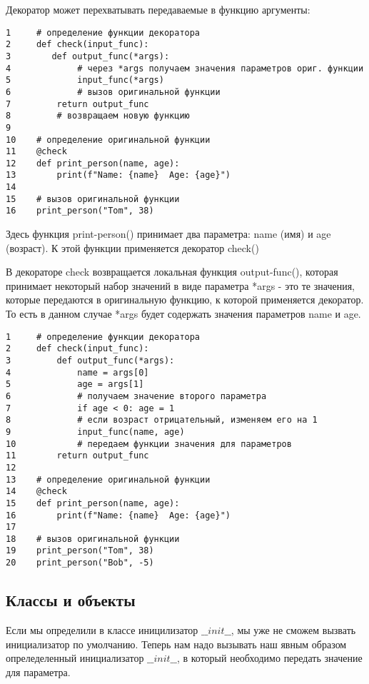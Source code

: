 \documentclass[12pt, a4paper]{article}
\begin{document}
Декоратор может перехватывать передаваемые в функцию аргументы:

\begin{verbatim}
1     # определение функции декоратора
2     def check(input_func):    
3        def output_func(*args):      
4             # через *args получаем значения параметров ориг. функции
5             input_func(*args)                
6             # вызов оригинальной функции
7         return output_func     
8         # возвращаем новую функцию
9  
10    # определение оригинальной функции
11    @check
12    def print_person(name, age):
13        print(f"Name: {name}  Age: {age}")
14 
15    # вызов оригинальной функции
16    print_person("Tom", 38)
\end{verbatim}

Здесь функция print-person() принимает два параметра: name (имя) и age (возраст). К этой функции применяется декоратор check()

\vspace{1em}

В декораторе check возвращается локальная функция output-func(), которая принимает некоторый набор значений в виде параметра *args - это те значения, которые передаются в оригинальную функцию, к которой применяется декоратор. То есть в данном случае *args будет содержать значения параметров name и age.

\begin{verbatim}
1     # определение функции декоратора
2     def check(input_func):    
3         def output_func(*args):
4             name = args[0]
5             age = args[1]           
6             # получаем значение второго параметра
7             if age < 0: age = 1     
8             # если возраст отрицательный, изменяем его на 1
9             input_func(name, age)   
10            # передаем функции значения для параметров
11        return output_func
12 
13    # определение оригинальной функции
14    @check
15    def print_person(name, age):
16        print(f"Name: {name}  Age: {age}")
17 
18    # вызов оригинальной функции
19    print_person("Tom", 38)
20    print_person("Bob", -5)
\end{verbatim}

\subsection{Классы и объекты}

Если мы определили в классе иницилизатор $\_\_init\_\_$, мы уже не сможем вызвать инициализатор по умолчанию. Теперь нам надо вызывать наш явным образом опреледеленный инициализатор $\_\_init\_\_$, в который необходимо передать значение для параметра.
\end{document}
